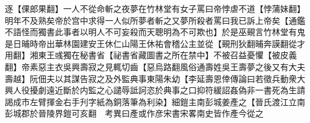 逐【倮郎果翻】一人不從命斬之夜夢在竹林堂有女子罵曰帝悖虐不道【悖蒲妹翻】明年不及熟矣帝於宫中求得一人似所夢者斬之又夢所殺者罵曰我已訴上帝矣【通鑑不語怪而獨書此事者以明人不可妄殺而天聰明為不可欺也】於是巫覡言竹林堂有鬼是日晡時帝出華林園建安王休仁山陽王休祐會稽公主並從【覡刑狄翻晡奔謨翻從才用翻】湘東王彧獨在秘書省【祕書省藏圖書之所在禁中】不被召益憂懼【被皮義翻】帝素惡主衣吳興壽寂之見輒切齒【惡烏路翻風俗通壽姓吳王壽夢之後又有大夫壽越】阮佃夫以其謀告寂之及外監典事東陽朱幼【李延壽恩倖傳論曰若徵兵動衆大興人役擾劇遠近斷於内監之心譴辱詆訶恣於典事之口抑符緩詔姦偽非一書死為生請謁成市左臂揮金右手刋字紙為銅落筆為利染】細鎧主南彭城姜產之【晉氏渡江立南彭城郡於晉陵界鎧可亥翻　考異曰產或作彦宋書宋畧南史皆作產今從之